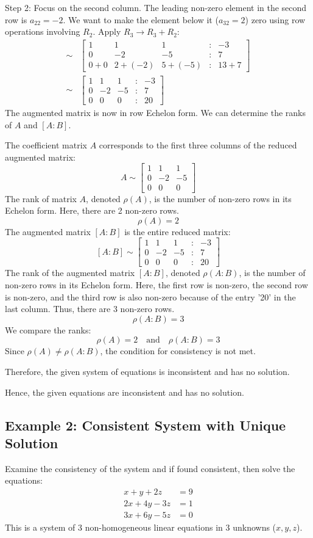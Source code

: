 \documentclass{article}
\begin{document}
Step 2: Focus on the second column. The leading non-zero element in the second row is $a_{22}=-2$. We want to make the element below it ($a_{32}=2$) zero using row operations involving $R_2$.
Apply $R_3 \to R_3 + R_2$:
\begin{align*} \sim &\begin{bmatrix} 1 & 1 & 1 & : & -3 \\ 0 & -2 & -5 & : & 7 \\ 0 + 0 & 2 + (-2) & 5 + (-5) & : & 13 + 7 \end{bmatrix} \\ \sim &\begin{bmatrix} 1 & 1 & 1 & : & -3 \\ 0 & -2 & -5 & : & 7 \\ 0 & 0 & 0 & : & 20 \end{bmatrix}\end{align*}
The augmented matrix is now in row Echelon form. We can determine the ranks of $A$ and $[A:B]$.

The coefficient matrix $A$ corresponds to the first three columns of the reduced augmented matrix:
\[ A \sim \begin{bmatrix} 1 & 1 & 1 \\ 0 & -2 & -5 \\ 0 & 0 & 0 \end{bmatrix} \]
The rank of matrix $A$, denoted $\rho(A)$, is the number of non-zero rows in its Echelon form. Here, there are 2 non-zero rows.
\[ \rho(A) = 2 \]
The augmented matrix $[A:B]$ is the entire reduced matrix:
\[ [A:B] \sim \begin{bmatrix} 1 & 1 & 1 & : & -3 \\ 0 & -2 & -5 & : & 7 \\ 0 & 0 & 0 & : & 20 \end{bmatrix} \]
The rank of the augmented matrix $[A:B]$, denoted $\rho(A:B)$, is the number of non-zero rows in its Echelon form. Here, the first row is non-zero, the second row is non-zero, and the third row is also non-zero because of the entry '20' in the last column. Thus, there are 3 non-zero rows.
\[ \rho(A:B) = 3 \]
We compare the ranks:
\[ \rho(A) = 2 \quad \text{and} \quad \rho(A:B) = 3 \]
Since $\rho(A) \neq \rho(A:B)$, the condition for consistency is not met.

Therefore, the given system of equations is inconsistent and has no solution.

Hence, the given equations are inconsistent and has no solution.

\subsection{Example 2: Consistent System with Unique Solution} %
Examine the consistency of the system and if found consistent, then solve the equations:
\begin{align*} x + y + 2z &= 9 \\ 2x + 4y - 3z &= 1 \\ 3x + 6y - 5z &= 0 \end{align*}
This is a system of 3 non-homogeneous linear equations in 3 unknowns ($x, y, z$).
\end{document}
